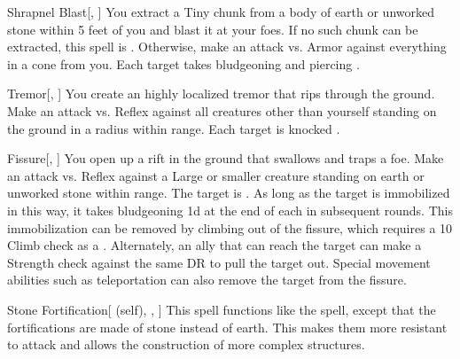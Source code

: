\begin{ability}[\nth{2}]{Shrapnel Blast}[, ]
You extract a Tiny chunk from a body of earth or unworked stone within 5 feet of you and blast it at your foes.
If no such chunk can be extracted, this spell is .
Otherwise, make an attack vs. Armor against everything in a \arealarge cone from you.
\hit Each target takes bludgeoning and piercing .
\end{ability}
\vspace{0.25em}



\begin{ability}[\nth{2}]{Tremor}[, ]
You create an highly localized tremor that rips through the ground.
Make an attack vs. Reflex against all creatures other than yourself standing on the ground in a \areamed radius within \rngmed range.
\hit Each target is knocked .
\end{ability}
\vspace{0.25em}



\begin{ability}[\nth{3}]{Fissure}[, ]
You open up a rift in the ground that swallows and traps a foe.
Make an attack vs. Reflex against a Large or smaller creature standing on earth or unworked stone within \rngmed range.
\hit The target is .
As long as the target is immobilized in this way,
it takes bludgeoning  \minus1d at the end of each  in subsequent rounds.
This immobilization can be removed by climbing out of the fissure, which requires a  10 Climb check as a .
Alternately, an ally that can reach the target can make a Strength check against the same DR to pull the target out.
Special movement abilities such as teleportation can also remove the target from the fissure.
\end{ability}
\vspace{0.25em}



\begin{ability}[\nth{3}]{Stone Fortification}[ (self), , ]
This spell functions like the  spell, except that the fortifications are made of stone instead of earth.
This makes them more resistant to attack and allows the construction of more complex structures.
\end{ability}
\vspace{0.25em}



